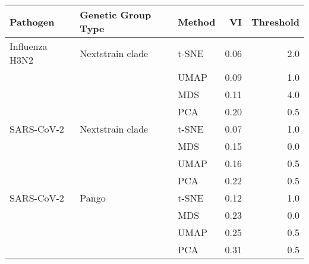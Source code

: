 \begin{tabular}{lllrr}
\toprule
      Pathogen & Genetic Group Type & Method &   VI &  Threshold \\
\midrule
Influenza H3N2 &   Nextstrain clade &  t-SNE & 0.06 &        2.0 \\
               &                    &   UMAP & 0.09 &        1.0 \\
               &                    &    MDS & 0.11 &        4.0 \\
               &                    &    PCA & 0.20 &        0.5 \\
    SARS-CoV-2 &   Nextstrain clade &  t-SNE & 0.07 &        1.0 \\
               &                    &    MDS & 0.15 &        0.0 \\
               &                    &   UMAP & 0.16 &        0.5 \\
               &                    &    PCA & 0.22 &        0.5 \\
    SARS-CoV-2 &              Pango &  t-SNE & 0.12 &        1.0 \\
               &                    &    MDS & 0.23 &        0.0 \\
               &                    &   UMAP & 0.25 &        0.5 \\
               &                    &    PCA & 0.31 &        0.5 \\
\bottomrule
\end{tabular}
